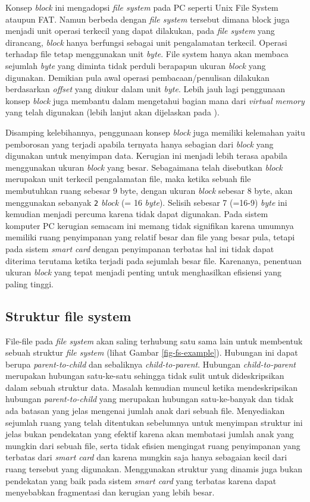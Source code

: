 \documentclass[a4paper, 12pt]{report}
\begin{document}
Konsep {\em block} ini mengadopsi {\em file system} pada PC seperti Unix File System ataupun FAT. Namun berbeda dengan {\em file system} tersebut dimana block juga menjadi unit operasi terkecil yang dapat dilakukan, pada {\em file system} yang dirancang, {\em block} hanya berfungsi sebagai unit pengalamatan terkecil. Operasi terhadap file tetap menggunakan unit {\em byte}. File system hanya akan membaca sejumlah {\em byte} yang diminta tidak perduli berapapun ukuran {\em block} yang digunakan. Demikian pula awal operasi pembacaan/penulisan dilakukan berdasarkan {\em offset} yang diukur dalam unit {\em byte}. Lebih jauh lagi penggunaan konsep {\em block} juga membantu dalam mengetahui bagian mana dari {\em virtual memory} yang telah digunakan (lebih lanjut akan dijelaskan pada ).

Disamping kelebihannya, penggunaan konsep {\em block} juga memiliki kelemahan yaitu pemborosan yang terjadi apabila ternyata hanya sebagian dari {\em block} yang digunakan untuk menyimpan data. Kerugian ini menjadi lebih terasa apabila menggunakan ukuran {\em block} yang besar. Sebagaimana telah disebutkan {\em block} merupakan unit terkecil pengalamatan file, maka ketika sebuah file membutuhkan ruang sebesar 9 byte, dengan ukuran {\em block} sebesar 8 byte, akan menggunakan sebanyak {\tt 2} {\em block} (= 16 {\em byte}). Selisih sebesar 7 (=16-9) {\em byte} ini kemudian menjadi percuma karena tidak dapat digunakan. Pada sistem komputer PC kerugian semacam ini memang tidak signifikan karena umumnya memiliki ruang penyimpanan yang relatif besar dan file yang besar pula, tetapi pada sistem \textsl{smart card} dengan penyimpanan terbatas hal ini tidak dapat diterima terutama ketika terjadi pada sejumlah besar file. Karenanya, penentuan ukuran {\em block} yang tepat menjadi penting untuk menghasilkan efisiensi yang paling tinggi.

\subsection{Struktur file system}
\label{fs-structure}

File-file pada {\em file system} akan saling terhubung satu sama lain untuk membentuk sebuah struktur {\em file system}  (lihat Gambar \ref{fig-fs-example}). Hubungan ini dapat berupa {\em parent-to-child} dan sebaliknya {\em child-to-parent}. Hubungan {\em child-to-parent} merupakan hubungan satu-ke-satu sehingga tidak sulit untuk dideskripsikan dalam sebuah struktur data. Masalah kemudian muncul ketika mendeskripsikan hubungan {\em parent-to-child} yang merupakan hubungan satu-ke-banyak dan tidak ada batasan yang jelas mengenai jumlah anak dari sebuah file. Menyediakan sejumlah ruang yang telah ditentukan sebelumnya untuk menyimpan struktur ini jelas bukan pendekatan yang efektif karena akan membatasi jumlah anak yang mungkin dari sebuah file, serta tidak efisien mengingat ruang penyimpanan yang terbatas dari \textsl{smart card} dan karena mungkin saja hanya sebagaian kecil dari ruang tersebut yang digunakan. Menggunakan struktur yang dinamis juga bukan pendekatan yang baik pada sistem \textsl{smart card} yang terbatas karena dapat menyebabkan fragmentasi dan kerugian yang lebih besar. 
\end{document}
